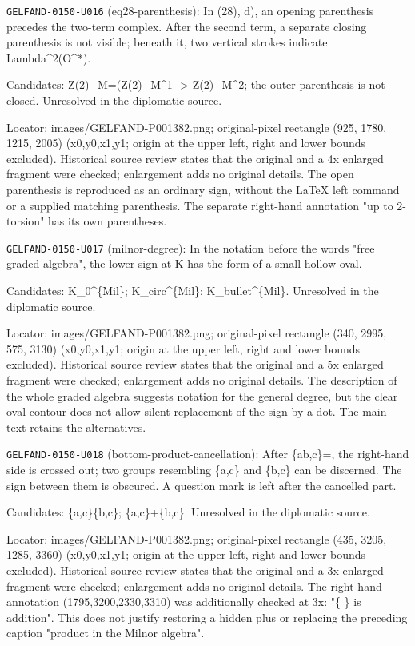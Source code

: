 \noindent\texttt{GELFAND-0150-U016} (eq28-parenthesis): In (28), d), an opening parenthesis precedes the two-term complex. After the second term, a separate closing parenthesis is not visible; beneath it, two vertical strokes indicate Lambda\textasciicircum{}2(O\textasciicircum{}*).\par
Candidates: Z(2)\_M=(Z(2)\_M\textasciicircum{}1 -> Z(2)\_M\textasciicircum{}2; the outer parenthesis is not closed. Unresolved in the diplomatic source.\par
Locator: images/GELFAND-P001382.png; original-pixel rectangle (925, 1780, 1215, 2005) (x0,y0,x1,y1; origin at the upper left, right and lower bounds excluded). Historical source review states that the original and a 4x enlarged fragment were checked; enlargement adds no original details. The open parenthesis is reproduced as an ordinary sign, without the LaTeX left command or a supplied matching parenthesis. The separate right-hand annotation "up to 2-torsion" has its own parentheses.\par

\noindent\texttt{GELFAND-0150-U017} (milnor-degree): In the notation before the words "free graded algebra", the lower sign at K has the form of a small hollow oval.\par
Candidates: K\_0\textasciicircum{}\{Mil\}; K\_circ\textasciicircum{}\{Mil\}; K\_bullet\textasciicircum{}\{Mil\}. Unresolved in the diplomatic source.\par
Locator: images/GELFAND-P001382.png; original-pixel rectangle (340, 2995, 575, 3130) (x0,y0,x1,y1; origin at the upper left, right and lower bounds excluded). Historical source review states that the original and a 5x enlarged fragment were checked; enlargement adds no original details. The description of the whole graded algebra suggests notation for the general degree, but the clear oval contour does not allow silent replacement of the sign by a dot. The main text retains the alternatives.\par

\noindent\texttt{GELFAND-0150-U018} (bottom-product-cancellation): After \{ab,c\}=, the right-hand side is crossed out; two groups resembling \{a,c\} and \{b,c\} can be discerned. The sign between them is obscured. A question mark is left after the cancelled part.\par
Candidates: \{a,c\}\{b,c\}; \{a,c\}+\{b,c\}. Unresolved in the diplomatic source.\par
Locator: images/GELFAND-P001382.png; original-pixel rectangle (435, 3205, 1285, 3360) (x0,y0,x1,y1; origin at the upper left, right and lower bounds excluded). Historical source review states that the original and a 3x enlarged fragment were checked; enlargement adds no original details. The right-hand annotation (1795,3200,2330,3310) was additionally checked at 3x: "\{ \} is addition". This does not justify restoring a hidden plus or replacing the preceding caption "product in the Milnor algebra".\par

